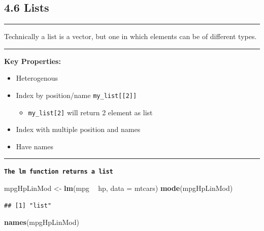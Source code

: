 \documentclass[]{article}
\newenvironment{Shaded}{\begin{snugshade}}{\end{snugshade}}
\newcommand{\KeywordTok}[1]{\textcolor[rgb]{0.13,0.29,0.53}{\textbf{#1}}}
\newcommand{\DataTypeTok}[1]{\textcolor[rgb]{0.13,0.29,0.53}{#1}}
\newcommand{\StringTok}[1]{\textcolor[rgb]{0.31,0.60,0.02}{#1}}
\newcommand{\OperatorTok}[1]{\textcolor[rgb]{0.81,0.36,0.00}{\textbf{#1}}}
\newcommand{\NormalTok}[1]{#1}
\providecommand{\tightlist}{%
  \setlength{\itemsep}{0pt}\setlength{\parskip}{0pt}}
\begin{document}
\subsection{4.6 Lists}\label{lists}

\begin{center}\rule{0.5\linewidth}{\linethickness}\end{center}

Technically a list is a vector, but one in which elements can be of
different types.

\begin{center}\rule{0.5\linewidth}{\linethickness}\end{center}

\textbf{Key Properties:}

\begin{itemize}
\tightlist
\item
  Heterogenous
\item
  Index by position/name \texttt{my\_list{[}{[}2{]}{]}}

  \begin{itemize}
  \tightlist
  \item
    \texttt{my\_list{[}2{]}} will return 2 element as list
  \end{itemize}
\item
  Index with multiple position and names
\item
  Have names
\end{itemize}

\begin{center}\rule{0.5\linewidth}{\linethickness}\end{center}

\textbf{\texttt{The\ lm\ function\ returns\ a\ list}}

\begin{Shaded}
\begin{Highlighting}[]
\NormalTok{mpgHpLinMod <-}\StringTok{ }\KeywordTok{lm}\NormalTok{(mpg }\OperatorTok{~}\StringTok{ }\NormalTok{hp, }\DataTypeTok{data =}\NormalTok{ mtcars)}
\KeywordTok{mode}\NormalTok{(mpgHpLinMod)}
\end{Highlighting}
\end{Shaded}

\begin{verbatim}
## [1] "list"
\end{verbatim}

\begin{Shaded}
\begin{Highlighting}[]
\KeywordTok{names}\NormalTok{(mpgHpLinMod)}
\end{Highlighting}
\end{Shaded}
\end{document}

